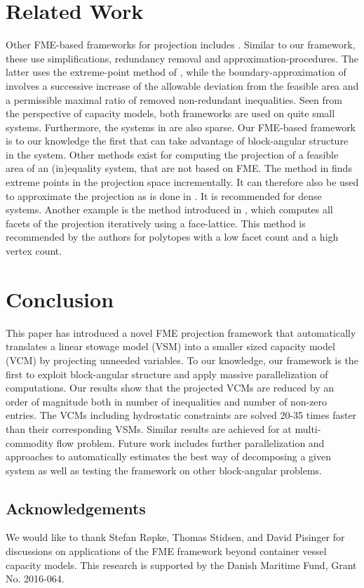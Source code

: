 \documentclass{llncs}
\begin{document}
\section{Related Work} \label{sec:relatedwork}
Other FME-based frameworks for projection includes \cite{simon05,lukatskii08,shapot12}. Similar to our framework, these use simplifications, redundancy removal and approximation-procedures. The latter uses the extreme-point method of \cite{huynh92}, while the boundary-approximation of \cite{lukatskii08,shapot12} involves a successive increase of the allowable deviation from the feasible area and a permissible maximal ratio of removed non-redundant inequalities. Seen from the perspective of capacity models, both frameworks are used on quite small systems. Furthermore, the systems in \cite{simon} are also sparse. Our FME-based framework is to our knowledge the first that can take advantage of block-angular structure in the system. Other methods exist for computing the projection of a feasible area of an (in)equality system, that are not based on FME. The method in \cite{huynh92} finds extreme points in the projection space incrementally. It can therefore also be used to approximate the projection as is done in \cite{simon05}. It is recommended for dense systems. Another example is the method introduced in \cite{jones04}, which computes all facets of the projection iteratively using a face-lattice. This method is recommended by the authors for polytopes with a low facet count and a high vertex count.


\section{Conclusion}\label{sec:conclusion}
This paper has introduced a novel FME projection framework that automatically translates a linear stowage model (VSM) into a smaller sized capacity model (VCM) by projecting unneeded variables. To our knowledge, our framework is the first to exploit block-angular structure and apply massive parallelization of computations. Our results show that the projected VCMs are reduced by an order of magnitude both in number of inequalities and number of non-zero entries. The VCMs including hydrostatic constraints are solved 20-35 times faster than their corresponding VSMs. Similar results are achieved for at multi-commodity flow problem. Future work includes further parallelization and approaches to automatically estimates the best way of decomposing a given system as well as testing the framework on other block-angular problems.

\subsection*{Acknowledgements}
\small We would like to thank Stefan R{\o}pke, Thomas Stidsen, and David Pisinger for discussions on applications of the FME framework beyond container vessel capacity models. This research is supported by the Danish Maritime Fund, Grant No. 2016-064.



\end{document}
